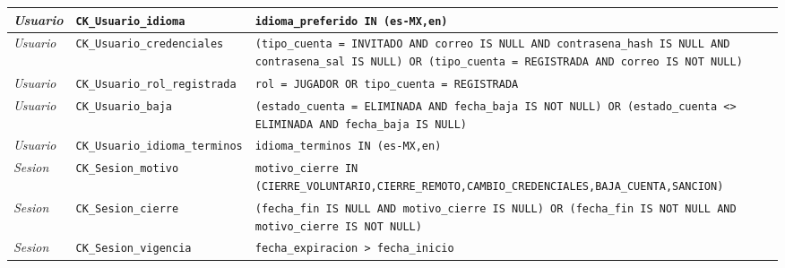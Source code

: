 \begin{center}
\begin{longtable}{|L{0.19\textwidth}|L{0.23\textwidth}|L{0.48\textwidth}|}
\textit{Usuario} & \texttt{CK\_\allowbreak{}Usuario\_\allowbreak{}idioma} & \texttt{idioma\_\allowbreak{}preferido IN (\textquotesingle{}es-MX\textquotesingle{},\allowbreak{}\textquotesingle{}en\textquotesingle{})} \\ \hline
\textit{Usuario} & \texttt{CK\_\allowbreak{}Usuario\_\allowbreak{}credenciales} & \texttt{(tipo\_\allowbreak{}cuenta = \textquotesingle{}INVITADO\textquotesingle{} AND correo IS NULL AND contrasena\_\allowbreak{}hash IS NULL AND contrasena\_\allowbreak{}sal IS NULL) OR (tipo\_\allowbreak{}cuenta = \textquotesingle{}REGISTRADA\textquotesingle{} AND correo IS NOT NULL)} \\ \hline
\textit{Usuario} & \texttt{CK\_\allowbreak{}Usuario\_\allowbreak{}rol\_\allowbreak{}registrada} & \texttt{rol = \textquotesingle{}JUGADOR\textquotesingle{} OR tipo\_\allowbreak{}cuenta = \textquotesingle{}REGISTRADA\textquotesingle{}} \\ \hline
\textit{Usuario} & \texttt{CK\_\allowbreak{}Usuario\_\allowbreak{}baja} & \texttt{(estado\_\allowbreak{}cuenta = \textquotesingle{}ELIMINADA\textquotesingle{} AND fecha\_\allowbreak{}baja IS NOT NULL) OR (estado\_\allowbreak{}cuenta <> \textquotesingle{}ELIMINADA\textquotesingle{} AND fecha\_\allowbreak{}baja IS NULL)} \\ \hline
\textit{Usuario} & \texttt{CK\_\allowbreak{}Usuario\_\allowbreak{}idioma\_\allowbreak{}terminos} & \texttt{idioma\_\allowbreak{}terminos IN (\textquotesingle{}es-MX\textquotesingle{},\allowbreak{}\textquotesingle{}en\textquotesingle{})} \\ \hline
\textit{Sesion} & \texttt{CK\_\allowbreak{}Sesion\_\allowbreak{}motivo} & \texttt{motivo\_\allowbreak{}cierre IN (\textquotesingle{}CIERRE\_\allowbreak{}VOLUNTARIO\textquotesingle{},\allowbreak{}\textquotesingle{}CIERRE\_\allowbreak{}REMOTO\textquotesingle{},\allowbreak{}\textquotesingle{}CAMBIO\_\allowbreak{}CREDENCIALES\textquotesingle{},\allowbreak{}\textquotesingle{}BAJA\_\allowbreak{}CUENTA\textquotesingle{},\allowbreak{}\textquotesingle{}SANCION\textquotesingle{})} \\ \hline
\textit{Sesion} & \texttt{CK\_\allowbreak{}Sesion\_\allowbreak{}cierre} & \texttt{(fecha\_\allowbreak{}fin IS NULL AND motivo\_\allowbreak{}cierre IS NULL) OR (fecha\_\allowbreak{}fin IS NOT NULL AND motivo\_\allowbreak{}cierre IS NOT NULL)} \\ \hline
\textit{Sesion} & \texttt{CK\_\allowbreak{}Sesion\_\allowbreak{}vigencia} & \texttt{fecha\_\allowbreak{}expiracion > fecha\_\allowbreak{}inicio} \\ \hline

\end{longtable}
\end{center}
